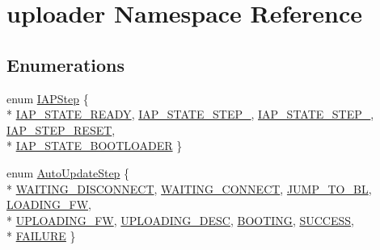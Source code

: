 \hypertarget{namespaceuploader}{\section{uploader Namespace Reference}
\label{namespaceuploader}
}
\subsection*{Enumerations}
\begin{DoxyCompactItemize}
\item 
enum \hyperlink{namespaceuploader_a96379f5e778372ce9b450507e371748c}{I\-A\-P\-Step} \{ \\*
\hyperlink{namespaceuploader_a96379f5e778372ce9b450507e371748ca4d7ab402d13049c724be462ab3e86f32}{I\-A\-P\-\_\-\-S\-T\-A\-T\-E\-\_\-\-R\-E\-A\-D\-Y}, 
\hyperlink{namespaceuploader_a96379f5e778372ce9b450507e371748cadcf37c4a8d78ec882d50caa23ef7a92a}{I\-A\-P\-\_\-\-S\-T\-A\-T\-E\-\_\-\-S\-T\-E\-P\-\_}, 
\hyperlink{namespaceuploader_a96379f5e778372ce9b450507e371748ca05f3caeaf62598ccd71f22904c0133be}{I\-A\-P\-\_\-\-S\-T\-A\-T\-E\-\_\-\-S\-T\-E\-P\-\_}, 
\hyperlink{namespaceuploader_a96379f5e778372ce9b450507e371748cab9b488a51846e6c84347274f36779074}{I\-A\-P\-\_\-\-S\-T\-E\-P\-\_\-\-R\-E\-S\-E\-T}, 
\\*
\hyperlink{namespaceuploader_a96379f5e778372ce9b450507e371748ca32ef078427b4b1305c4655d5bb311edb}{I\-A\-P\-\_\-\-S\-T\-A\-T\-E\-\_\-\-B\-O\-O\-T\-L\-O\-A\-D\-E\-R}
 \}
\item 
enum \hyperlink{namespaceuploader_adb90c08cc33a348c2363c1d7a9626422}{Auto\-Update\-Step} \{ \\*
\hyperlink{namespaceuploader_adb90c08cc33a348c2363c1d7a9626422a22167077407ea89374e584dc1be2f1bc}{W\-A\-I\-T\-I\-N\-G\-\_\-\-D\-I\-S\-C\-O\-N\-N\-E\-C\-T}, 
\hyperlink{namespaceuploader_adb90c08cc33a348c2363c1d7a9626422ac4eb7b758182282742e995fc9dfcb459}{W\-A\-I\-T\-I\-N\-G\-\_\-\-C\-O\-N\-N\-E\-C\-T}, 
\hyperlink{namespaceuploader_adb90c08cc33a348c2363c1d7a9626422a18a1a0a92f31bc1c10706e17e84861d9}{J\-U\-M\-P\-\_\-\-T\-O\-\_\-\-B\-L}, 
\hyperlink{namespaceuploader_adb90c08cc33a348c2363c1d7a9626422a75d625e092d3cd4e29d039fbe0545da6}{L\-O\-A\-D\-I\-N\-G\-\_\-\-F\-W}, 
\\*
\hyperlink{namespaceuploader_adb90c08cc33a348c2363c1d7a9626422a272216e4f96a6bb84dff89ec621628c8}{U\-P\-L\-O\-A\-D\-I\-N\-G\-\_\-\-F\-W}, 
\hyperlink{namespaceuploader_adb90c08cc33a348c2363c1d7a9626422a5b5629a532fa42326814e6578ccb84ec}{U\-P\-L\-O\-A\-D\-I\-N\-G\-\_\-\-D\-E\-S\-C}, 
\hyperlink{namespaceuploader_adb90c08cc33a348c2363c1d7a9626422aad345dfdc3c7fae8b868380b3d33f7f7}{B\-O\-O\-T\-I\-N\-G}, 
\hyperlink{namespaceuploader_adb90c08cc33a348c2363c1d7a9626422a8114b09d7e9f283c5e4b98c33a507337}{S\-U\-C\-C\-E\-S\-S}, 
\\*
\hyperlink{namespaceuploader_adb90c08cc33a348c2363c1d7a9626422aad60a4f2851531ca5125824791c411f0}{F\-A\-I\-L\-U\-R\-E}
 \}
\end{DoxyCompactItemize}


